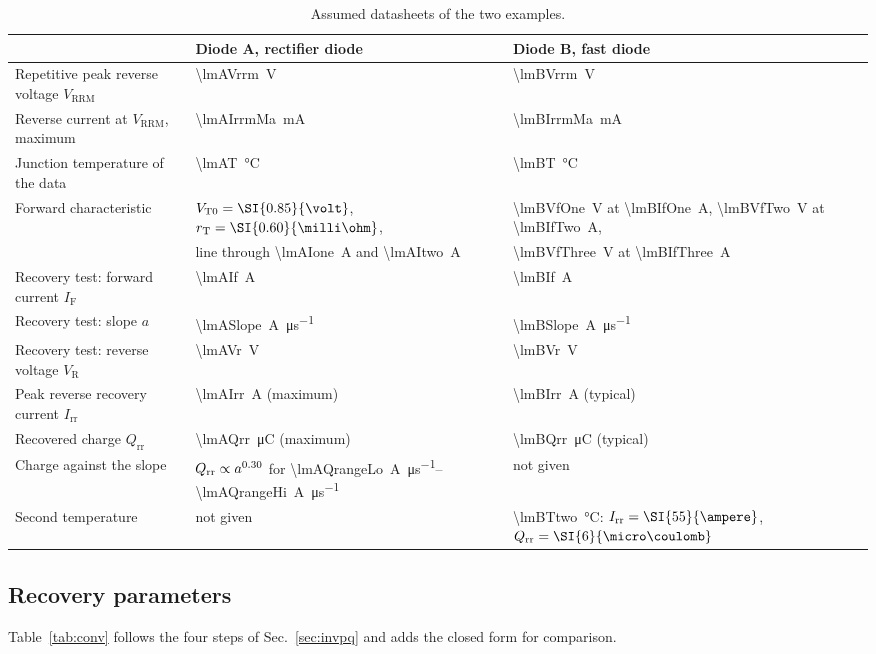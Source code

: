 \documentclass[10pt,a4paper]{scrartcl}
\newcommand{\IF}{I_\mathrm{F}}
\newcommand{\VR}{V_\mathrm{R}}
\newcommand{\Irr}{I_\mathrm{rr}}
\newcommand{\Qrr}{Q_\mathrm{rr}}
\newcommand{\VTo}{V_\mathrm{T0}}
\newcommand{\rT}{r_\mathrm{T}}
\newcommand{\Vrrm}{V_\mathrm{RRM}}
\begin{document}
\begin{table}[htb]
\centering\small
\caption{Assumed datasheets of the two examples.}
\label{tab:data}
\begin{tabular}{@{}lll@{}}
\toprule
 & Diode A, rectifier diode & Diode B, fast diode \\
\midrule
Repetitive peak reverse voltage $\Vrrm$ & \SI{\lmAVrrm}{\volt} & \SI{\lmBVrrm}{\volt} \\
Reverse current at $\Vrrm$, maximum & \SI{\lmAIrrmMa}{\milli\ampere} & \SI{\lmBIrrmMa}{\milli\ampere} \\
Junction temperature of the data & \SI{\lmAT}{\celsius} & \SI{\lmBT}{\celsius} \\
Forward characteristic & $\VTo = \SI{\lmAVto}{\volt}$, $\rT = \SI{\lmARt}{\milli\ohm}$, & \SI{\lmBVfOne}{\volt} at \SI{\lmBIfOne}{\ampere}, \SI{\lmBVfTwo}{\volt} at \SI{\lmBIfTwo}{\ampere}, \\
 & line through \SI{\lmAIone}{\ampere} and \SI{\lmAItwo}{\ampere} & \SI{\lmBVfThree}{\volt} at \SI{\lmBIfThree}{\ampere} \\
Recovery test: forward current $\IF$ & \SI{\lmAIf}{\ampere} & \SI{\lmBIf}{\ampere} \\
Recovery test: slope $a$ & \SI{\lmASlope}{\ampere\per\micro\second} & \SI{\lmBSlope}{\ampere\per\micro\second} \\
Recovery test: reverse voltage $\VR$ & \SI{\lmAVr}{\volt} & \SI{\lmBVr}{\volt} \\
Peak reverse recovery current $\Irr$ & \SI{\lmAIrr}{\ampere} (maximum) & \SI{\lmBIrr}{\ampere} (typical) \\
Recovered charge $\Qrr$ & \SI{\lmAQrr}{\micro\coulomb} (maximum) & \SI{\lmBQrr}{\micro\coulomb} (typical) \\
Charge against the slope & $\Qrr \propto a^{\lmAQexp}$ for \SIrange{\lmAQrangeLo}{\lmAQrangeHi}{\ampere\per\micro\second} & not given \\
Second temperature & not given & \SI{\lmBTtwo}{\celsius}: $\Irr = \SI{\lmBIrrTtwo}{\ampere}$, $\Qrr = \SI{\lmBQrrTtwo}{\micro\coulomb}$ \\
\bottomrule
\end{tabular}
\end{table}

\subsection{Recovery parameters}
\label{sec:exrec}
Table~\ref{tab:conv} follows the four steps of Sec.~\ref{sec:invpq} and adds the closed form for comparison.
\end{document}
